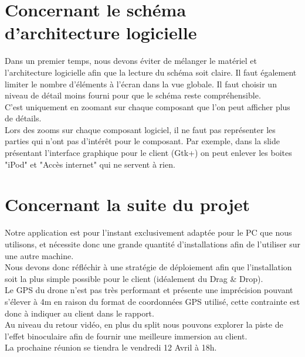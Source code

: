 \documentclass[]{article}
\begin{document}
\section{Concernant le schéma d'architecture logicielle}
Dans un premier temps, nous devons éviter de mélanger le matériel et l'architecture logicielle afin que la lecture du schéma soit claire.
Il faut également limiter le nombre d'éléments à l'écran dans la vue globale. Il faut choisir un niveau de détail moins fourni pour que le schéma reste compréhensible. \\
C'est uniquement en zoomant sur chaque composant que l'on peut afficher plus de détails.\\
Lors des zooms sur chaque composant logiciel, il ne faut pas représenter les parties qui n'ont pas d'intérêt pour le composant. Par exemple, dans la slide présentant l'interface graphique pour le client (Gtk+) on peut enlever les boites "iPod" et "Accès internet" qui ne servent à rien.

\section{Concernant la suite du projet}

Notre application est pour l'instant exclusivement adaptée pour le PC que nous utilisons, et nécessite donc une grande quantité d'installations afin de l'utiliser sur une autre machine.\\
Nous devons donc réfléchir à une stratégie de déploiement afin que l'installation soit la plus simple possible pour le client (idéalement du Drag \& Drop).\\
Le GPS du drone n'est pas très performant et présente une imprécision pouvant s'élever à 4m en raison du format de coordonnées GPS utilisé, cette contrainte est donc à indiquer au client dans le rapport.\\
Au niveau du retour vidéo, en plus du split nous pouvons explorer la piste de l'effet binoculaire afin de fournir une meilleure immersion au client.\\
La prochaine réunion se tiendra le vendredi 12 Avril à 18h.
\end{document}
